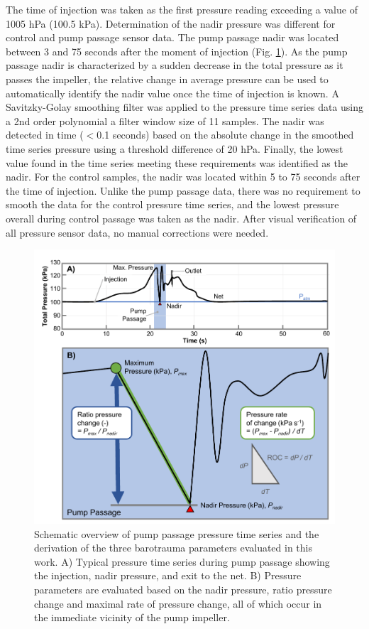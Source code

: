 \documentclass[fleqn,10pt]{wlscirep}
\begin{document}
The time of injection was taken as the first pressure reading exceeding a value of 1005 hPa (100.5 kPa). Determination of the nadir pressure was different for control and pump passage sensor data. The pump passage nadir was located between 3 and 75 seconds after the moment of injection (Fig. \ref{fig:p_data}). As the pump passage nadir is characterized by a sudden decrease in the total pressure as it passes the impeller, the relative change in average pressure can be used to automatically identify the nadir value once the time of injection is known. A Savitzky-Golay smoothing filter was applied to the pressure time series data using a 2nd order polynomial a filter window size of 11 samples. The nadir was detected in time ($<$0.1 seconds) based on the absolute change in the smoothed time series pressure using a threshold difference of 20 hPa. Finally, the lowest value found in the time series meeting these requirements was identified as the nadir. For the control samples, the nadir was located within 5 to 75 seconds after the time of injection. Unlike the pump passage data, there was no requirement to smooth the data for the control pressure time series, and the lowest pressure overall during control passage was taken as the nadir. After visual verification of all pressure sensor data, no manual corrections were needed.

\begin{figure}[ht]
  \centering
  \includegraphics[scale=0.75]{Fig_Pressure_Data_Cropped.pdf}
  \caption{Schematic overview of pump passage pressure time series and the derivation of the three barotrauma parameters evaluated in this work. A) Typical pressure time series during pump passage showing the injection, nadir pressure, and exit to the net. B) Pressure parameters are evaluated based on the nadir pressure, ratio pressure change and maximal rate of pressure change, all of which occur in the immediate vicinity of the pump impeller.}
  \label{fig:p_data}
\end{figure}
\end{document}
